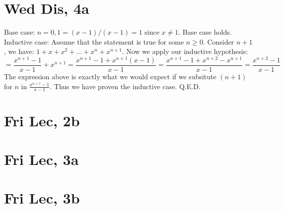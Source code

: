 \documentclass[12pt]{article}
\begin{document}
\section{Wed Dis, 4a}
Base case: $n = 0, 1 = (x-1)/(x-1) = 1$ since $x \neq 1$. Base case holds.
\newline
Inductive case: Assume that the statement is true for some $n \geq 0$. Consider $n+1$, we have: $1 + x + x^2 + ... + x^n + x^{n+1}$. Now we apply our inductive hypothesis:
$$= \frac{x^{n+1}-1}{x-1} + x^{n+1} = \frac{x^{n+1}-1+x^{n+1}(x-1)}{x-1} = \frac{x^{n+1}-1+x^{n+2}-x^{n+1}}{x-1} = \frac{x^{n+2}-1}{x-1}$$
The expression above is exactly what we would expect if we subsitute $(n+1)$ for $n$ in $\frac{x^{n+1}-1}{x-1}$. Thus we have proven the inductive case. Q.E.D.
\newpage


\section{Fri Lec, 2b}

\section{Fri Lec, 3a}

\section{Fri Lec, 3b}
\end{document}
